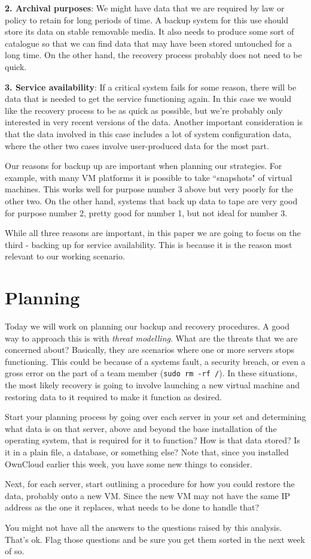 \documentclass{article}   	%
\begin{document}
\textbf{2. Archival purposes}: We might have data that we are required by law or policy to retain for long periods of time. A backup system for this use should store its data on stable removable media. It also needs to produce some sort of catalogue so that we can find data that may have been stored untouched for a long time. On the other hand, the recovery process probably does not need to be quick.

\textbf{3. Service availability}: If a critical system fails for some reason, there will be data that is needed to get the service functioning again. In this case we would like the recovery process to be as quick as possible, but we're probably only interested in very recent versions of the data. Another important consideration is that the data involved in this case includes a lot of system configuration data, where the other two cases involve user-produced data for the most part.

Our reasons for backup up are important when planning our strategies. For example, with many VM platforms it is possible to take ``snapshots" of virtual machines. This works well for purpose number 3 above but very poorly for the other two. On the other hand, systems that back up data to tape are very good for purpose number 2, pretty good for number 1, but not ideal for number 3.

While all three reasons are important, in this paper we are going to focus on the third - backing up for service availability. This is because it is the reason most relevant to our working scenario.

\newpage

\section{Planning}
Today we will work on planning our backup and recovery procedures. A good way to approach this is with \emph{threat modelling}. What are the threats that we are concerned about? Basically, they are scenarios where one or more servers stops functioning. This could be because of a systems fault, a security breach, or even a gross error on the part of a team member (\texttt{sudo rm -rf /}). In these situations, the most likely recovery is going to involve launching a new virtual machine and restoring data to it required to make it function as desired.

Start your planning process by going over each server in your set and determining what data is on that server, above and beyond the base installation of the operating system, that is required for it to function? How is that data stored? Is it in a plain file, a database, or something else? Note that, since you installed OwnCloud earlier this week, you have some new things to consider. 

Next, for each server, start outlining a procedure for how you could restore the data, probably onto a new VM. Since the new VM may not have the same IP address as the one it replaces, what needs to be done to handle that? 

You might not have all the answers to the questions raised by this analysis. That's ok. Flag those questions and be sure you get them sorted in the next week of so.
\end{document}
